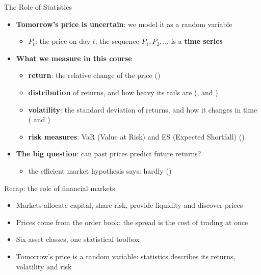 \begin{frame}{The Role of Statistics}
\itemsize{\small}
\begin{itemize}
    \item \textbf{Tomorrow's price is uncertain}: we model it as a random variable
    \begin{itemize}
        \item $P_t$: the price on day $t$; the sequence $P_1, P_2, \ldots$ is a \textbf{time series}
    \end{itemize}
    \item \textbf{What we measure in this course}
    \begin{itemize}
        \item \textbf{return}: the relative change of the price ()
        \item \textbf{distribution} of returns, and how heavy its tails are (,  and )
        \item \textbf{volatility}: the standard deviation of returns, and how it changes in time ( and )
        \item \textbf{risk measures}: VaR (Value at Risk) and ES (Expected Shortfall) ()
    \end{itemize}
    \item \textbf{The big question}: can past prices predict future returns?
    \begin{itemize}
        \item the efficient market hypothesis says: hardly ()
    \end{itemize}
\end{itemize}
\end{frame}

\begin{frame}{Recap: the role of financial markets}
\itemsize{\small}
\begin{itemize}
    \item Markets allocate capital, share risk, provide liquidity and discover prices
    \item Prices come from the order book: the spread is the cost of trading at once
    \item Six asset classes, one statistical toolbox
    \item Tomorrow's price is a random variable: statistics describes its returns, volatility and risk
\end{itemize}
\end{frame}


